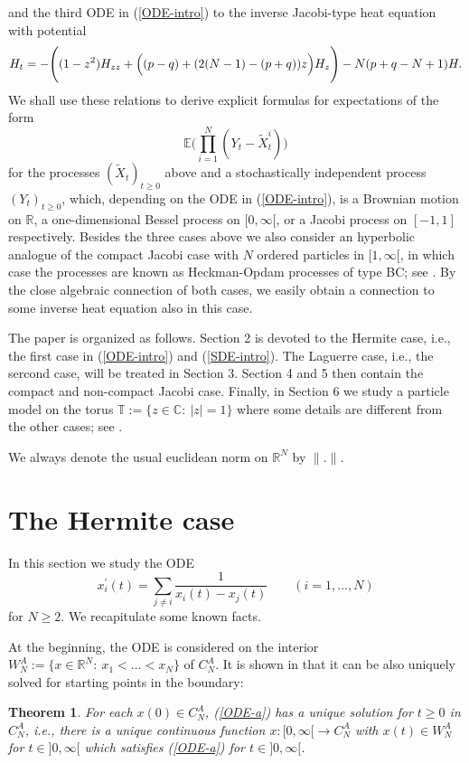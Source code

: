 \documentclass[reqno]{amsart}
\theoremstyle{plain}
\newtheorem{theorem}{Theorem}[section]
\theoremstyle{definition}
\numberwithin{equation}{section}
\begin{document}
and  the third  ODE in  (\ref{ODE-intro})
to the inverse Jacobi-type heat equation with potential
 $$  H_t=  -\Biggl( (1-z^2) H_{zz}+ \Bigl( (p-q)+(2(N-1)-(p+q))z\Bigr) H_{z} \Biggr) -N(p+q-N+1)H. $$
We shall use these relations to derive explicit formulas for expectations of the form
$$\mathbb E\bigl(\prod_{i=1}^N (Y_t- \tilde X_{t}^i)\bigr)$$
for the processes $(\tilde X_t)_{t\ge0}$ above and a stochastically independent process $(Y_t)_{t\ge0}$, which, depending on the ODE in 
(\ref{ODE-intro}), is  a Brownian motion on $\mathbb R$, a one-dimensional Bessel process on $[0,\infty[$, or a Jacobi process on $[-1,1]$
    respectively.
    Besides the three cases  above we also consider an hyperbolic analogue of the compact Jacobi case with $N$ ordered particles in $[1,\infty[$,
        in which case the processes are known as Heckman-Opdam processes of type BC; see \cite{Sch1,Sch2}. By the close algebraic connection 
of both cases, we easily obtain a connection to some inverse heat equation also in this case.

The paper is organized as follows. Section 2 is  devoted to the Hermite case, i.e., the first case in  (\ref{ODE-intro}) and 
(\ref{SDE-intro}). The Laguerre case, i.e., the sercond case, will be treated in Section 3.
Section 4 and 5 then contain the compact and non-compact Jacobi case. Finally, in Section 6 we study a particle model 
 on the torus $\mathbb T:=\{z\in\mathbb C:\> |z|=1\}$ where some details are  different from the other cases; see \cite{HW, LV, RV2}.



We  always denote the usual euclidean norm on $\mathbb R^N$ by $\|.\|$.

\section{The Hermite case}

In this section we study the ODE
\begin{equation}\label{ODE-a}
x_i^\prime(t)= \sum_{j\ne i} \frac{1}{x_i(t)-x_j(t)} \quad\quad (i=1,\ldots,N)
\end{equation}
for $N\ge2$. We  recapitulate some known facts.

At the beginning, the ODE is considered 
on the interior $ W_N^A:=\{x\in\mathbb R^N: \> x_1<\ldots<x_N\}$ of   $ C_N^A$.
It is shown in \cite{VW3} that it can be also uniquely solved for starting points in the boundary:


\begin{theorem}\label{ode-ex-unique-a-thm}
For each $x(0)\in C_N^A$,  (\ref{ODE-a})
has a unique solution for  $t\ge0$ in  $ C_N^A$, i.e.,
 there is a unique continuous function
$x:[0,\infty[\to C_N^A$ with  $x(t)\in  W_N^{A} $  for $t\in]0,\infty[$
which satisfies  (\ref{ODE-a}) for $t\in]0,\infty[$.
\end{theorem}
\end{document}
